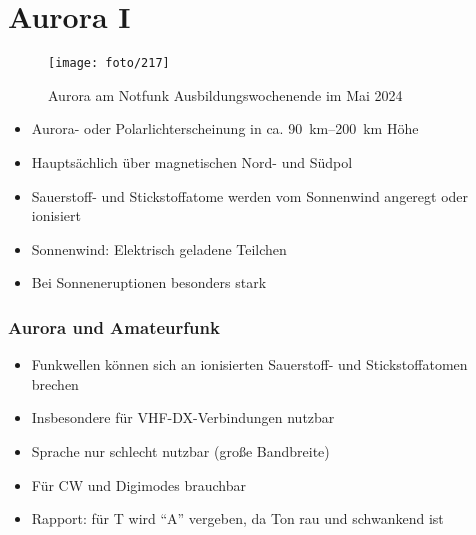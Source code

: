 
\section{Aurora I}
\label{section:aurora_1}
\begin{frame}%

\begin{figure}
    \texttt{[image: foto/217]}
    \caption{\scriptsize Aurora am Notfunk Ausbildungswochenende im Mai 2024}
    \label{e_aurora}
\end{figure}
\end{frame}

\begin{frame}\begin{itemize}
  \item Aurora- oder Polarlichterscheinung in ca. \qtyrange{90}{200}{\kilo\metre} Höhe
  \item Hauptsächlich über magnetischen Nord- und Südpol
  \item Sauerstoff- und Stickstoffatome werden vom Sonnenwind angeregt oder ionisiert
  \item Sonnenwind: Elektrisch geladene Teilchen
  \item Bei Sonneneruptionen besonders stark
  \end{itemize}
\end{frame}

\begin{frame}
\frametitle{Aurora und Amateurfunk}
\begin{itemize}
  \item Funkwellen können sich an ionisierten Sauerstoff- und Stickstoffatomen brechen
  \item Insbesondere für VHF-DX-Verbindungen nutzbar
  \item Sprache nur schlecht nutzbar (große Bandbreite)
  \item Für CW und Digimodes brauchbar
  \item Rapport: für T wird \enquote{A} vergeben, da Ton rau und schwankend ist 
  \end{itemize}
\end{frame}


